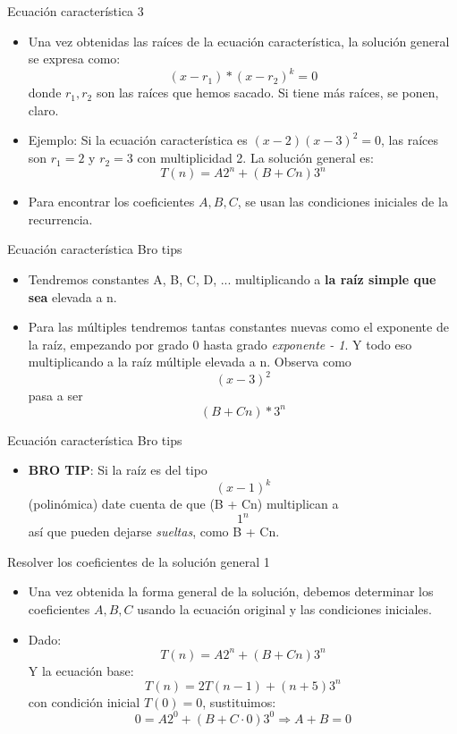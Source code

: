 \documentclass[aspectratio=169]{beamer}
\begin{document}
\begin{frame}{Ecuación característica 3}
\begin{itemize}
    \item Una vez obtenidas las raíces de la ecuación característica, la solución general se expresa como:
    \[
    (x-r_1)*(x-r_2)^k = 0 
    \]
    donde \( r_1, r_2 \) son las raíces que hemos sacado. Si tiene más raíces, se ponen, claro.
    
    \item {Ejemplo:} Si la ecuación característica es \( (x-2)(x-3)^2 = 0 \), las raíces son \( r_1 = 2 \) y \( r_2 = 3 \) con multiplicidad 2. La solución general es:
        \[
        T(n) = A 2^n + (B + Cn) 3^n
        \]
    \item Para encontrar los coeficientes \( A, B, C \), se usan las condiciones iniciales de la recurrencia.
\end{itemize}
\end{frame}


\begin{frame}{Ecuación característica Bro tips}
\begin{itemize}
    \item Tendremos constantes A, B, C, D, ... multiplicando a \textbf{la raíz simple que sea} elevada a n.
    \item Para las múltiples tendremos tantas constantes nuevas como el exponente de la raíz, empezando por grado 0 hasta grado \textit{exponente - 1}. Y todo eso multiplicando a la raíz múltiple elevada a n. Observa como \[ (x-3)^2\] pasa a ser \[(B + Cn)*3^n\]

   
\end{itemize}
\end{frame}


\begin{frame}{Ecuación característica Bro tips}
\begin{itemize}
       \item \textbf{BRO TIP}: Si la raíz es del tipo \[(x-1)^k\] (polinómica) date cuenta de que (B + Cn) multiplican a \[1^n\] así que pueden dejarse \textit{sueltas}, como B + Cn.
   
\end{itemize}
\end{frame}

\begin{frame}{Resolver los coeficientes de la solución general 1}
\begin{itemize}
    \item Una vez obtenida la forma general de la solución, debemos determinar los coeficientes \( A, B, C \) usando la ecuación original y las condiciones iniciales.
    
    \item Dado:
    \[
    T(n) = A 2^n + (B + Cn) 3^n
    \]
    Y la ecuación base:
    \[
    T(n) = 2T(n-1) + (n+5)3^n
    \]
    con condición inicial \( T(0) = 0 \), sustituimos:
    \[
    0 = A 2^0 + (B + C \cdot 0) 3^0 \Rightarrow A + B = 0
    \]
    
   
\end{itemize}
\end{frame}
\end{document}
